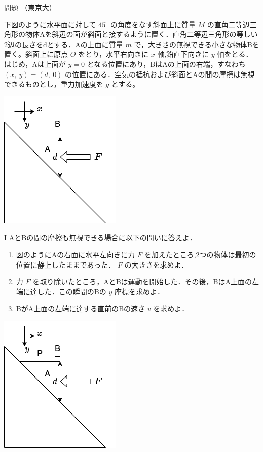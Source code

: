 \documentclass[
  b4paperpaper,
  xelatex,ja=standard]{bxjsbook}
\providecommand{\tightlist}{%
  \setlength{\itemsep}{0pt}\setlength{\parskip}{0pt}}\usepackage{longtable,booktabs,array}
\begin{document}
\begin{Qbox}{問題}
（東京大）

下図のように水平面に対して \(45^{\circ}\) の角度をなす斜面上に質量 \(M\)
の直角二等辺三角形の物体Aを斜辺の面が斜面と接するように置く．直角二等辺三角形の等しい2辺の長さをdとする．Aの上面に質量
\(m\) で，大きさの無視できる小さな物体Bを置く。斜面上に原点 \(O\)
をとり，水平右向きに \(x\) 軸,鉛直下向きに \(y\)
軸をとる．はじめ，Aは上面が \(y=0\)
となる位置にあり，BはAの上面の右端，すなわち \((x,\:y)=(d,\:0)\)
の位置にある．空気の抵抗および斜面とAの間の摩擦は無視できるものとし，重力加速度を
\(g\) とする。

\includegraphics{source/images/newton/newton23.png}

I AとBの間の摩擦も無視できる場合に以下の問いに答えよ．

\begin{enumerate}
\def\labelenumi{\arabic{enumi}.}
\tightlist
\item
  図のようにAの右面に水平左向きに力 \(F\)
  を加えたところ,2つの物体は最初の位置に静上したままであった． \(F\)
  の大きさを求めよ．
\item
  力 \(F\)
  を取り除いたところ，AとBは運動を開始した．その後，BはA上面の左端に達した．この瞬間のBの
  \(y\) 座標を求めよ．
\item
  BがA上面の左端に達する直前のBの速さ \(v\) を求めよ．
\end{enumerate}

\includegraphics{source/images/newton/newton21.png}


\end{Qbox}
\end{document}
